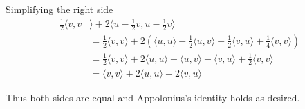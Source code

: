 \documentclass{article}
\begin{document}
Simplifying the right side
\begin{align*}
\frac{1}{2}\langle v,v&\rangle+2\langle u-\frac{1}{2}v,u-\frac{1}{2}v\rangle\\
&=\frac{1}{2}\langle v,v\rangle+2(\langle u,u\rangle-\frac{1}{2}\langle u,v\rangle-\frac{1}{2}\langle v,u\rangle+\frac{1}{4}\langle v,v\rangle)\\
&=\frac{1}{2}\langle v,v\rangle+2\langle u,u\rangle-\langle u,v\rangle-\langle v,u\rangle+\frac{1}{2}\langle v,v\rangle\\
&=\langle v,v\rangle+2\langle u,u\rangle-2\langle v,u\rangle
\end{align*}

Thus both sides are equal and Appolonius's identity holds as desired.
\end{document}
